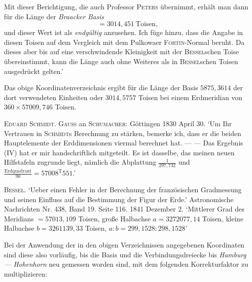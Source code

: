 Mit dieser Berichtigung, die auch Professor \textsc{Peters} übernimmt, erhält man dann für die Länge der \textit{Braacker Basis}
\[
=3014{,}451\ \text{Toisen},
\]
und dieser Wert ist als \textit{endgültig} anzusehen. Ich füge hinzu, dass die Angabe in diesen Toisen auf dem Vergleich mit dem Pulkowaer \textsc{Fortin}-Normal beruht. Da dieses aber bis auf eine verschwindende Kleinigkeit mit der \textsc{Bessel}schen Toise übereinstimmt, kann die Länge auch ohne Weiteres als in \textsc{Bessel}schen Toisen ausgedrückt gelten.’

Das obige Koordinatenverzeichnis ergibt für die Länge der Basis \(5875{,}3614\) der dort verwendeten Einheiten oder \(3014{,}5757\) Toisen bei einem Erdmeridian von \(360\times57009{,}746\) Toisen.

\textsc{Eduard Schmidt. Gauss} an \textsc{Schumacher}: Göttingen 1830 April 30. ‘Um Ihr Vertrauen in \textsc{Schmidt}s Berechnung zu stärken, bemerke ich, dass er die beiden Hauptelemente der Erddimensionen viermal berechnet hat. — — Das Ergebnis (IV) hat er mir handschriftlich mitgeteilt. Es ist dasselbe, das meinen neuen Hilfstafeln zugrunde liegt, nämlich die Abplattung \(\frac{1}{297{,}732}\) und \(\frac{\text{Erdquadrant}}{90}=57008^{\mathrm{T}}551\).’

\textsc{Bessel}. ‘Ueber einen Fehler in der Berechnung der französischen Gradmessung und seinen Einfluss auf die Bestimmung der Figur der Erde.’ Astronomische Nachrichten Nr. 438, Band 19. Seite 116. 1841 Dezember 2. ‘Mittlerer Grad des Meridians \(=57013{,}109\) Toisen, große Halbachse \(a=3272077{,}14\) Toisen, kleine Halbachse \(b=3261139{,}33\) Toisen, \(a:b=299{,}1528:298{,}1528\)’

Bei der Anwendung der in den obigen Verzeichnissen angegebenen Koordinaten sind diese also vorläufig, bis die Basis und die Verbindungsdreiecke bis \textit{Hamburg — Hohenhorn} neu gemessen worden sind, mit dem folgenden Korrekturfaktor zu multiplizieren:
